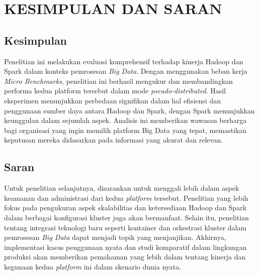 \chapter{KESIMPULAN DAN SARAN}

\section{Kesimpulan}
Penelitian ini melakukan evaluasi komprehensif terhadap kinerja Hadoop dan Spark dalam konteks pemrosesan \textit{Big Data}. Dengan menggunakan beban kerja \textit{Micro Benchmarks}, penelitian ini berhasil mengukur dan membandingkan performa kedua platform tersebut dalam mode \textit{pseudo-distributed}. Hasil eksperimen menunjukkan perbedaan signifikan dalam hal efisiensi dan penggunaan sumber daya antara Hadoop dan Spark, dengan Spark menunjukkan keunggulan dalam sejumlah aspek. Analisis ini memberikan wawasan berharga bagi organisasi yang ingin memilih platform Big Data yang tepat, memastikan keputusan mereka didasarkan pada informasi yang akurat dan relevan.

\section{Saran}
Untuk penelitian selanjutnya, disarankan untuk menggali lebih dalam aspek keamanan dan administrasi dari kedua \textit{platform} tersebut. Penelitian yang lebih fokus pada pengukuran aspek skalabilitas dan ketersediaan Hadoop dan Spark dalam berbagai konfigurasi kluster juga akan bermanfaat. Selain itu, penelitian tentang integrasi teknologi baru seperti kontainer dan orkestrasi kluster dalam pemrosesan \textit{Big Data} dapat menjadi topik yang menjanjikan. Akhirnya, implementasi kasus penggunaan nyata dan studi komparatif dalam lingkungan produksi akan memberikan pemahaman yang lebih dalam tentang kinerja dan kegunaan kedua \textit{platform} ini dalam skenario dunia nyata.